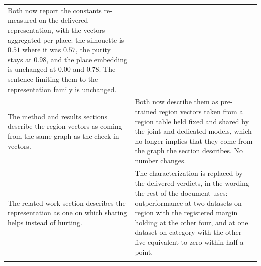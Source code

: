 \begin{table}[htb]
\begin{tabular}{@{}p{}p{}@{}}
Both now report the constants re-measured on the delivered
representation, with the vectors aggregated per place: the
silhouette is $0.51$ where it was $0.57$, the purity stays at
$0.98$, and the place embedding is unchanged at $0.00$ and
$0.78$. The sentence limiting them to the representation
family is unchanged. \\
\addlinespace
The method and results sections describe the region vectors as
coming from the same graph as the check-in vectors. &
Both now describe them as pre-trained region vectors taken
from a region table held fixed and shared by the joint and
dedicated models, which no longer implies that they come from
the graph the section describes. No number changes. \\
\addlinespace
The related-work section describes the representation as one
on which sharing helps instead of hurting. &
The characterization is replaced by the delivered verdicts, in
the wording the rest of the document uses: outperformance at
two datasets on region with the registered margin holding at
the other four, and at one dataset on category with the other
five equivalent to zero within half a point. \\
\addlinespace

\end{tabular}
\end{table}

